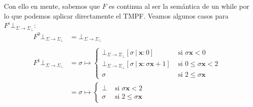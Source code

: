 \documentclass{article}
\newcommand{\x}{\textbf{x}}
\newcommand{\cdom}{\Sigma \to \Sigma_\bot}
\newcommand{\cfbot}{\bot_{\cdom}}
\begin{document}
Con ello en mente, sabemos que $F$ es continua al ser la semántica de un while por lo que podemos aplicar directamente el TMPF.
Veamos algunos casos para $F^i \cfbot$:
\begin{equation*}
  \begin{aligned}
    F^0 \cfbot &= \cfbot \\ 
    \\ 
    F^1 \cfbot &= \sigma \mapsto \begin{cases}
      \cfbot [\sigma\ |\ \x : 0] &\text{ si }\sigma \x < 0 \\ 
      \cfbot [\sigma\ |\ \x : \sigma \x + 1] &\text{ si }0 \leq \sigma \x < 2 \\ 
      \sigma &\text{ si }2 \leq \sigma \x 
    \end{cases} \\ 
               &= \sigma \mapsto \begin{cases}
                 \bot &\text{ si }\sigma \x < 2 \\ 
                 \sigma &\text{ si }2 \leq \sigma \x
               \end{cases} \\ 
  \end{aligned}
\end{equation*}
\end{document}
